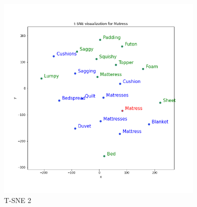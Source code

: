 \documentclass[a4paper]{article}    %
\begin{document}
\begin{figure}[H]
    \centering
    \includegraphics[width=10cm]{tsne2}
    \caption{T-SNE 2}
    \label{fig:tsne2}
\end{figure}

\end{document}
